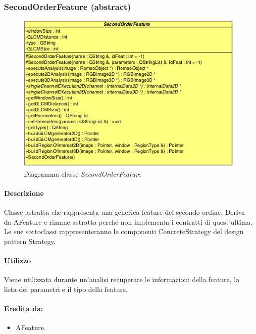 \color{black}
\pagebreak
\subsubsection{SecondOrderFeature (abstract)}
\label{SecondOrderFeature}
\begin{figure}[!h]
\centering
			\includegraphics[scale=1]{./Content/Immagini/modelCore/SecondOrderFeature.png}
			\caption{Diagramma classe \textsl{SecondOrderFeature}}
			\label{SecondOrder_img}
\end{figure}

\paragraph{Descrizione \\} Classe astratta che rappresenta una generica feature\g{} del secondo ordine. Deriva da AFeature e rimane astratta perché non implementa i contratti di quest'ultima. Le sue sottoclassi rappresenteranno le componenti ConcreteStrategy del design pattern\g{} Strategy.

\paragraph{Utilizzo\\} Viene utilizzata durante un'analisi recuperare le informazioni della feature\g{}, la lista dei parametri e il tipo della feature\g{}.

\paragraph{Eredita da:}
\begin{itemize}
	\item AFeature.
\end{itemize}

